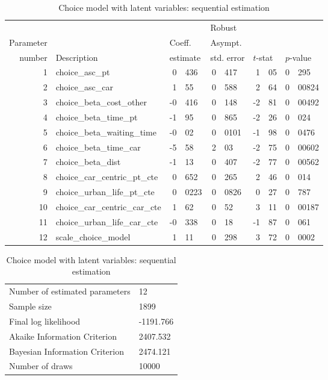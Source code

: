 \documentclass[12pt,a4paper]{article}
\begin{document}
\begin{table}[htb]
  \footnotesize
  \begin{center}
\begin{tabular}{rlr@{.}lr@{.}lr@{.}lr@{.}l}
          &              &   \multicolumn{2}{l}{}         & \multicolumn{2}{l}{Robust}  &  \multicolumn{4}{l}{}  \\
Parameter &              &   \multicolumn{2}{l}{Coeff.}   & \multicolumn{2}{l}{Asympt.}       & \multicolumn{4}{l}{}   \\
number    &  Description &   \multicolumn{2}{l}{estimate} & \multicolumn{2}{l}{std. error}    & \multicolumn{2}{l}{$t$-stat}  &  \multicolumn{2}{l}{$p$-value} \\
\hline
1 & choice\_asc\_pt & 0&436 & 0&417 & 1&05 & 0&295 \\ 
2 & choice\_asc\_car & 1&55 & 0&588 & 2&64 & 0&00824 \\ 
3 & choice\_beta\_cost\_other & -0&416 & 0&148 & -2&81 & 0&00492 \\ 
4 & choice\_beta\_time\_pt & -1&95 & 0&865 & -2&26 & 0&024 \\ 
5 & choice\_beta\_waiting\_time & -0&02 & 0&0101 & -1&98 & 0&0476 \\ 
6 & choice\_beta\_time\_car & -5&58 & 2&03 & -2&75 & 0&00602 \\ 
7 & choice\_beta\_dist & -1&13 & 0&407 & -2&77 & 0&00562 \\ 
8 & choice\_car\_centric\_pt\_cte & 0&652 & 0&265 & 2&46 & 0&014 \\ 
9 & choice\_urban\_life\_pt\_cte & 0&0223 & 0&0826 & 0&27 & 0&787 \\ 
10 & choice\_car\_centric\_car\_cte & 1&62 & 0&52 & 3&11 & 0&00187 \\ 
11 & choice\_urban\_life\_car\_cte & -0&338 & 0&18 & -1&87 & 0&061 \\ 
12 & scale\_choice\_model & 1&11 & 0&298 & 3&72 & 0&0002 \\ 
\end{tabular}
  \end{center}
\begin{flushleft}
\begin{tabular}{ll}
Number of estimated parameters & 12 \\
Sample size & 1899 \\
Final log likelihood & -1191.766 \\
Akaike Information Criterion & 2407.532 \\
Bayesian Information Criterion & 2474.121 \\
Number of draws & 10000 \\
\end{tabular}
\end{flushleft}
  \caption{Choice model with latent variables: sequential estimation\label{tab:choice_sequential}}
\end{table}
\end{document}
